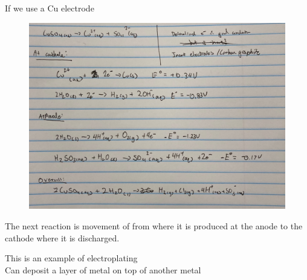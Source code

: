 \documentclass{article}
\begin{document}
If we use a Cu electrode
\begin{figure}
\includegraphics[width=\textwidth]{5.3circuit2.jpg}
\end{figure}
The next reaction is movement of  from where it is produced at the anode to the cathode where it is discharged.

This is an example of electroplating\\Can deposit a layer of metal on top of another metal
\end{document}
